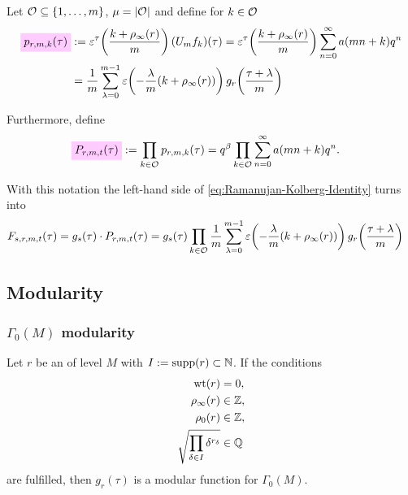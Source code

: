 \documentclass{article}
\begin{document}
Let $\mathcal{O}_{} \subseteq \left\{1,\ldots,m\right\}$,
$\mu=\lvert\mathcal{O}_{}\rvert$ and define for
$k \in \mathcal{O}_{}$
\begin{align}
  \defineNotation[p-r-m-k-tau]{p_{r,m,k}(\tau)}
  &:= \unityPowerTau{\frac{k+\rho_\infty(r)}{m} } (U_mf_k)(\tau)
  = \unityPowerTau{\frac{k+\rho_\infty(r)}{m}} \sum_{n=0}^\infty a(mn+k) q^n
  \notag
  \\
  &=
    \frac{1}{m} \sum_{\lambda=0}^{m-1}
    \unityPower{-\frac{\lambda}{m} (k+\rho_\infty(r))}
    g_r\!\left(\frac{\tau+\lambda}{m}\right)
      \label{eq:p_r-m-k(tau)}
\end{align}

Furthermore, define
\begin{align}
  \defineNotation[P-r-m-t-tau]{P_{r, m, t}(\tau)}
  &:= \prod_{k \in \modularOrbit{}} p_{r,m,k}(\tau)
  = q^\beta \prod_{k \in \modularOrbit{}} \sum_{n=0}^\infty a(mn+k) q^n.
\end{align}


With this notation the left-hand side of
\eqref{eq:Ramanujan-Kolberg-Identity} turns into
\begin{align}
  \label{eq:F_s-r-m-t(tau)}
  F_{s,r,m,t}(\tau)
  &=
    g_s(\tau) \cdot P_{r,m,t}(\tau)
  =
    g_s(\tau)
    \prod_{k\in\mathcal{O}_{}}
    \frac{1}{m} \sum_{\lambda=0}^{m-1}
    \varepsilon\!\left(-\frac{\lambda}{m} (k+\rho_\infty(r))\right)
    g_r\!\left(\frac{\tau+\lambda}{m}\right)
\end{align}



\subsection{Modularity}

\subsubsection{$\Gamma_0(M)$ modularity}

\begin{Lemma}\cite[Thm. 1.64]{Ono_WebOfModularity_2004}
  \label{thm:modular-eta-quotient-gamma0}
  Let $r$ be an  of level $M$
  with $I := \operatorname{supp}(r) \subset \mathbb{N}$. If the conditions
  \begin{align}
    \operatorname{wt}(r) &= 0, \label{eq:sum=0}\\
    \rho_\infty(r) &\in \mathbb{Z}, \label{eq:pure-rhoinfinity}\\
    \rho_0(r) &\in \mathbb{Z}, \label{eq:pure-rho0}\\
    \sqrt{\prod_{\delta\in I}\delta^{r_\delta}}&\in\mathbb{Q}\label{eq:productsquare}
  \end{align}
  are fulfilled, then $g_r(\tau)$ is a modular function for
  $\Gamma_0(M)$.
\end{Lemma}
\end{document}
